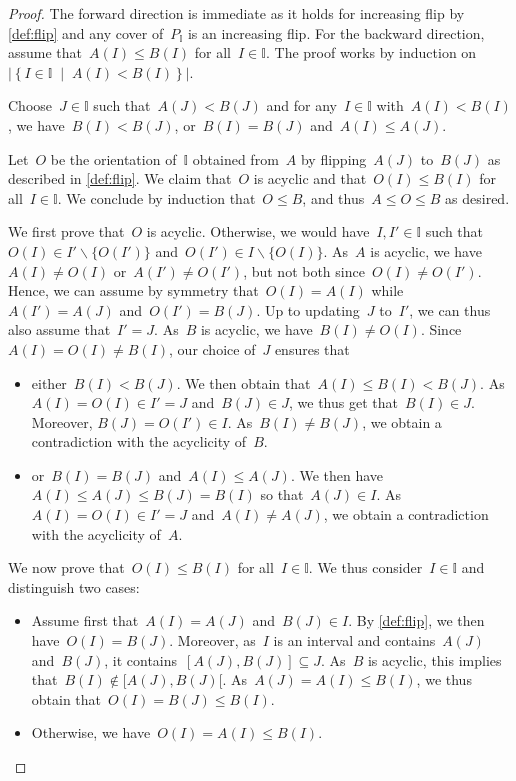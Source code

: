 \documentclass{amsart}
\theoremstyle{definition}
\newcommand{\set}[2]{\left\{ #1 \;\middle|\; #2 \right\}} %
\newcommand{\ssm}{\smallsetminus} %
\newcommand{\II}{\mathbb I} %
\begin{document}
\begin{proof}
The forward direction is immediate as it holds for increasing flip by \cref{def:flip} and any cover of~$P_\II$ is an increasing flip.
For the backward direction, assume that~$A(I) \le B(I)$ for all~$I \in \II$.
The proof works by induction on~$|\set{I \in \II}{A(I) < B(I)}|$.

Choose~$J \in \II$ such that~$A(J) < B(J)$ and for any~$I \in \II$ with~$A(I) < B(I)$, we have~$B(I) < B(J)$, or~$B(I) = B(J)$ and~$A(I) \le A(J)$.

Let~$O$ be the orientation of~$\II$ obtained from~$A$ by flipping~$A(J)$ to~$B(J)$ as described in \cref{def:flip}.
We claim that~$O$ is acyclic and that~$O(I) \le B(I)$ for all~$I \in \II$. 
We conclude by induction that~$O \le B$, and thus~$A \le O \le B$ as desired.

We first prove that~$O$ is acyclic.
Otherwise, we would have~$I,I' \in \II$ such that~$O(I) \in I' \ssm \{O(I')\}$ and~$O(I') \in I \ssm \{O(I)\}$.
As~$A$ is acyclic, we have~$A(I) \ne O(I)$ or~$A(I') \ne O(I')$, but not both since~$O(I) \ne O(I')$.
Hence, we can assume by symmetry that~$O(I) = A(I)$ while~$A(I') = A(J)$ and~$O(I') = B(J)$.
Up to updating~$J$ to~$I'$, we can thus also assume that~$I' = J$.
As~$B$ is acyclic, we have~$B(I) \ne O(I)$.
Since~$A(I) = O(I) \ne B(I)$, our choice of~$J$ ensures that
\begin{itemize}
\item either~$B(I) < B(J)$. 
We then obtain that~$A(I) \le B(I) < B(J)$.
As~$A(I) = O(I) \in I' = J$ and~$B(J) \in J$, we thus get that~$B(I) \in J$.
Moreover, $B(J) = O(I') \in I$.
As~$B(I) \ne B(J)$, we obtain a contradiction with the acyclicity of~$B$.
\item or~$B(I) = B(J)$ and~$A(I) \le A(J)$.
We then have~$A(I) \le A(J) \le B(J) = B(I)$ so that~$A(J) \in I$.
As~$A(I) = O(I) \in I' = J$ and~$A(I) \ne A(J)$, we obtain a contradiction with the acyclicity of~$A$.
\end{itemize}

We now prove that~$O(I) \le B(I)$ for all~$I \in \II$.
We thus consider~$I \in \II$ and distinguish two cases:
\begin{itemize}
\item Assume first that~$A(I) = A(J)$ and~$B(J) \in I$. By \cref{def:flip}, we then have~${O(I) = B(J)}$. Moreover, as~$I$ is an interval and contains~$A(J)$ and~$B(J)$, it contains~$[A(J), B(J)] \subseteq J$. As~$B$ is acyclic, this implies that~$B(I) \notin {[A(J), B(J)[}$. As~$A(J) = A(I) \le B(I)$, we thus obtain that~$O(I) = B(J) \le B(I)$.
\item Otherwise, we have~$O(I) = A(I) \le B(I)$.
\qedhere
\end{itemize}
\end{proof}
\end{document}
